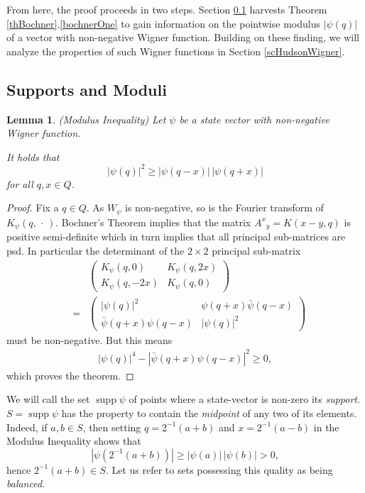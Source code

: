 \documentclass[aps,twocolumn,floatfix]{revtex4}
\newtheorem{lemma}[theorem]{Lemma}
\def\spacedot{\,\cdot\,}
\DeclareMathOperator{\supp}{supp}
\begin{document}
From here, the proof proceeds in two steps. Section
\ref{scHudsonModulus} harvests Theorem
\ref{thBochner}.\ref{bochnerOne} to gain information on the pointwise
modulus $|\psi(q)|$ of a vector with non-negative Wigner function.
Building on these finding, we will analyze the properties of such
Wigner functions in Section \ref{scHudsonWigner}.

\subsection{Supports and Moduli}
\label{scHudsonModulus}

\begin{lemma} \label{lmIneq} 
	\emph{(Modulus Inequality)}
	Let $\psi$ be a state vector with non-negative Wigner function.

	It holds that
	\begin{equation*}
		|\psi(q)|^2 \geq |\psi(q-x)|\,|\psi(q+x)|
	\end{equation*}
	for all $q,x \in Q$.
\end{lemma}


\begin{proof}
	Fix a $q \in Q$.  As $W_\psi$ is non-negative, so is the Fourier
	transform of $K_\psi(q,\spacedot)$. Bochner's Theorem implies that the
	matrix ${A^x}_y = K(x-y,q)$ is positive semi-definite which in turn
	implies that all principal sub-matrices are psd. In particular the
	determinant of the $2\times 2$ principal sub-matrix 
	\begin{eqnarray*}
		&&
		\left(
		\begin{array}{cc}
			K_\psi(q,0) & K_\psi(q,2x) \\
			K_\psi(q, -2x) & K_\psi(q,0) 
		\end{array}
		\right) \\
		&=&
		\left(
		\begin{array}{cc}
			|\psi(q)|^2	&	\psi(q+x)\bar\psi(q-x) \\
			\bar\psi(q+x)\psi(q-x) & |\psi(q)|^2 
		\end{array}
		\right)
	\end{eqnarray*}
	must be non-negative. But this means
	\begin{eqnarray*}
		|\psi(q)|^4 - |\bar\psi(q+x)	\psi(q-x)|^2 \geq 0,
	\end{eqnarray*}
	which proves the theorem.
\end{proof}


We will call the set $\supp\psi$ of points where a state-vector is
non-zero its \emph{support}.  $S=\supp\psi$ has the property to
contain the \emph{midpoint} of any two of its elements. Indeed, if $a, b
\in S$, then setting $q=2^{-1} (a+b)$ and $x=2^{-1}(a-b)$ in the
Modulus Inequality shows that
\begin{equation*}
	|\psi(2^{-1} (a+b))| \geq |\psi(a)|\,|\psi(b)| > 0,
\end{equation*}
hence $2^{-1}(a+b) \in S$. Let us refer to sets possessing this quality
as being \emph{balanced}.
\end{document}
